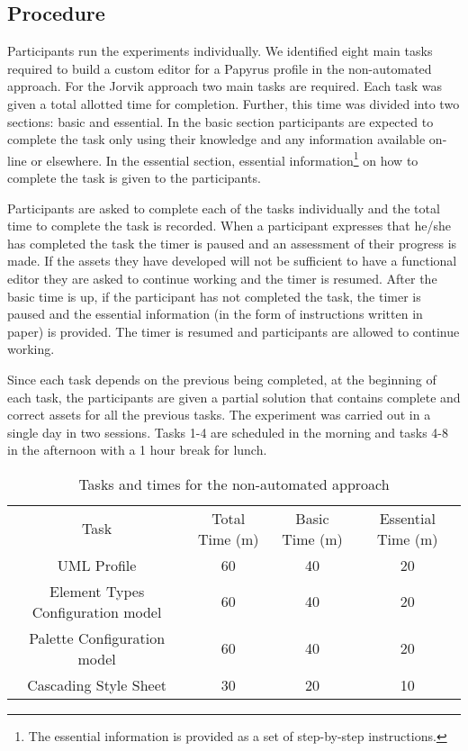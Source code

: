 \subsection{Procedure}
Participants run the experiments individually.
We identified eight main tasks required to build a custom editor for a Papyrus profile in the non-automated approach.
For the Jorvik approach two main tasks are required.
Each task was given a total allotted time for completion. Further, this time was divided into two sections: basic and essential.
In the basic section participants are expected to complete the task only using their knowledge and any information available on-line or elsewhere.
In the essential section, essential information\footnote{The essential information is provided as a set of step-by-step instructions.} on how to complete the task is given to the participants.

Participants are asked to complete each of the tasks individually and the total time to complete the task is recorded.
When a participant expresses that he/she has completed the task the timer is paused and an assessment of their progress is made.
If the assets they have developed will not be sufficient to have a functional editor they are asked to continue working and the timer is resumed.
After the basic time is up, if the participant has not completed the task, the timer is paused and the essential information (in the form of instructions written in paper)
is provided.
The timer is resumed and participants are allowed to continue working.

Since each task depends on the previous being completed, at the beginning of each task, the participants are given a partial solution that contains complete and correct assets for all the previous tasks.
The experiment was carried out in a single day in two sessions.
Tasks 1-4 are scheduled in the morning and tasks 4-8 in the afternoon with a 1 hour break for lunch.

\begin{table}
    \caption{Tasks and times for the non-automated approach}
    \centering
    \setlength{\tabcolsep}{3.5pt} 
    \begin{tabular}{|c|c|c|c|}
        Task & Total Time (m) & Basic Time (m) & Essential Time (m) \\ 
        UML Profile & 60 & 40 & 20 \\
        Element Types Configuration model & 60 & 40 & 20 \\
        Palette Configuration model & 60 & 40 & 20 \\
        Cascading Style Sheet & 30 & 20 & 10 \\
    \end{tabular}
\end{table}

